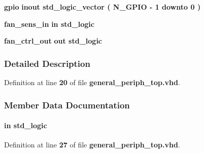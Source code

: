 \begin{DoxyCompactItemize}
\item 
{\bf gpio}  {\bfseries {\bfseries \textcolor{keywordflow}{inout}\textcolor{vhdlchar}{ }}} {\bfseries \textcolor{comment}{std\+\_\+logic\+\_\+vector}\textcolor{vhdlchar}{ }\textcolor{vhdlchar}{(}\textcolor{vhdlchar}{ }\textcolor{vhdlchar}{ }\textcolor{vhdlchar}{ }\textcolor{vhdlchar}{ }{\bfseries {\bf N\+\_\+\+G\+P\+IO}} \textcolor{vhdlchar}{-\/}\textcolor{vhdlchar}{ } \textcolor{vhdldigit}{1} \textcolor{vhdlchar}{ }\textcolor{keywordflow}{downto}\textcolor{vhdlchar}{ }\textcolor{vhdlchar}{ } \textcolor{vhdldigit}{0} \textcolor{vhdlchar}{ }\textcolor{vhdlchar}{)}\textcolor{vhdlchar}{ }} 
\item 
{\bf fan\+\_\+sens\+\_\+in}  {\bfseries {\bfseries \textcolor{keywordflow}{in}\textcolor{vhdlchar}{ }}} {\bfseries \textcolor{comment}{std\+\_\+logic}\textcolor{vhdlchar}{ }} 
\item 
{\bf fan\+\_\+ctrl\+\_\+out}  {\bfseries {\bfseries \textcolor{keywordflow}{out}\textcolor{vhdlchar}{ }}} {\bfseries \textcolor{comment}{std\+\_\+logic}\textcolor{vhdlchar}{ }} 
\end{DoxyCompactItemize}


\subsubsection{Detailed Description}


Definition at line {\bf 20} of file {\bf general\+\_\+periph\+\_\+top.\+vhd}.



\subsubsection{Member Data Documentation}
\paragraph[{clk}]{ {\bfseries \textcolor{keywordflow}{in}\textcolor{vhdlchar}{ }} {\bfseries \textcolor{comment}{std\+\_\+logic}\textcolor{vhdlchar}{ }} \hspace{0.3cm}{\ttfamily [Port]}}\label{classgeneral__periph__top_a4a4609c199d30b3adebbeb3a01276ec5}


Definition at line {\bf 27} of file {\bf general\+\_\+periph\+\_\+top.\+vhd}.


